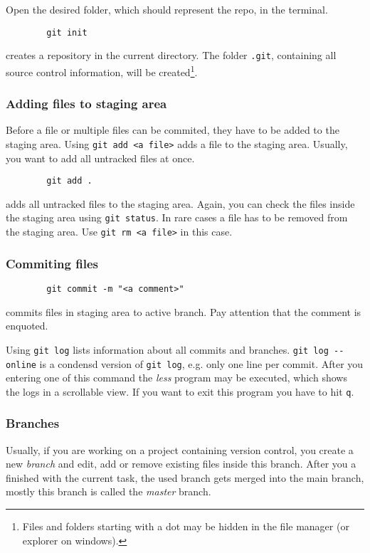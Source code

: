 \documentclass[12pt, twoside]{article}
\begin{document}
	Open the desired folder, which should represent the repo, in the terminal.
	\begin{verbatim}
		git init
	\end{verbatim}
	creates a repository in the current directory. The folder \verb|.git|, containing all source control information, will be created\footnote{Files and folders starting with a dot may be hidden in the file manager (or explorer on windows).}.
	
	\subsubsection{Adding files to staging area}
	
	Before a file or multiple files can be commited, they have to be added to the staging area. Using \verb|git add <a file>| adds a file to the staging area. Usually, you want to add all untracked files at once. 
	\begin{verbatim}
		git add .
	\end{verbatim}
	adds all untracked files to the staging area. Again, you can check the files inside the staging area using \verb|git status|. In rare cases a file has to be removed from the staging area. Use \verb|git rm <a file>| in this case.
	
	\subsubsection{Commiting files}
	
	\begin{verbatim}
		git commit -m "<a comment>"
	\end{verbatim}
	commits files in staging area to active branch. Pay attention that the comment is enquoted.
	
	Using \verb|git log| lists information about all commits and branches. \verb|git log --online| is a condensd version of \verb|git log|, e.g. only one line per commit. After you entering one of this command the \textit{less} program may be executed, which shows the logs in a scrollable view. If you want to exit this program you have to hit \verb|q|.
	
	\subsubsection{Branches}
	
	Usually, if you are working on a project containing version control, you create a new \textit{branch} and edit, add or remove existing files inside this branch. After you a finished with the current task, the used branch gets merged into the main branch, mostly this branch is called the \textit{master} branch.
	
\end{document}
